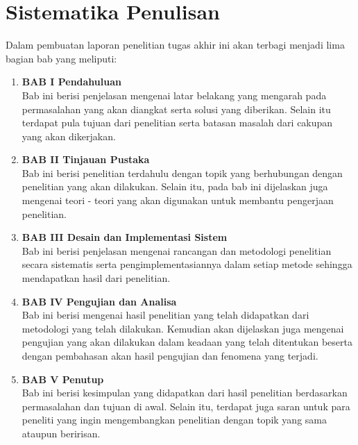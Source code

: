 \section{Sistematika Penulisan}
\label{sec:sistematikapenulisan
}

Dalam pembuatan laporan penelitian tugas akhir ini akan terbagi menjadi lima bagian bab yang meliputi:

\begin{enumerate}[nolistsep]

  \item \textbf{BAB I Pendahuluan} \\     
      Bab ini berisi penjelasan mengenai latar belakang yang mengarah pada permasalahan yang akan diangkat serta solusi yang diberikan. Selain itu terdapat pula tujuan dari penelitian serta batasan masalah dari cakupan yang akan dikerjakan.
        \vspace{2ex}

  \item \textbf{BAB II Tinjauan Pustaka} \\
      Bab ini berisi penelitian terdahulu dengan topik yang berhubungan dengan penelitian yang akan dilakukan. Selain itu, pada bab ini dijelaskan juga mengenai teori - teori yang akan digunakan untuk membantu pengerjaan penelitian.

        \vspace{2ex}

  \item \textbf{BAB III Desain dan Implementasi Sistem} \\
      Bab ini berisi penjelasan mengenai rancangan dan metodologi penelitian secara sistematis serta pengimplementasiannya dalam setiap metode sehingga mendapatkan hasil dari penelitian.

        \vspace{2ex}

  \item \textbf{BAB IV Pengujian dan Analisa} \\
      Bab ini berisi mengenai hasil penelitian yang telah didapatkan dari metodologi yang telah dilakukan. Kemudian akan dijelaskan juga mengenai pengujian yang akan dilakukan dalam keadaan yang telah ditentukan beserta dengan pembahasan akan hasil pengujian dan fenomena yang terjadi.

        \vspace{2ex}

  \item \textbf{BAB V Penutup} \\
      Bab ini berisi kesimpulan yang didapatkan dari hasil penelitian berdasarkan permasalahan dan tujuan di awal. Selain itu, terdapat juga saran untuk para peneliti yang ingin mengembangkan penelitian dengan topik yang sama ataupun beririsan.

\end{enumerate}
